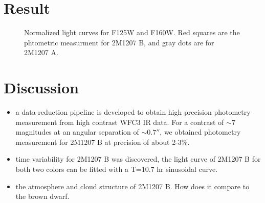\documentclass[apj]{emulateapj}
\begin{document}
\section{Result}
\begin{figure}[h]
  \centering
  \caption{Normalized light curves for F125W and F160W. Red squares
    are the phtometric measurment for 2M1207 B, and gray dots are for
    2M1207 A.}
  \label{fig:3}
\end{figure}
\section{Discussion }
\begin{itemize}
\item a data-reduction pipeline is developed to obtain high precision
  photometry measurement from high contrast WFC3 IR data. For a
  contrast of $\sim 7$ magnitudes at an angular separation of
  $\sim0.7''$, we obtained photometry measurement for 2M1207 B at
  precision of about 2-3\%. 
\item time variability for 2M1207 B was discovered, the light curve of
  2M1207 B for both two colors can be fitted with a T=10.7 hr
  sinusoidal curve.
\item the atmosphere and cloud structure of 2M1207 B. How does it
  compare to the brown dwarf.
\end{itemize}

\end{document}
